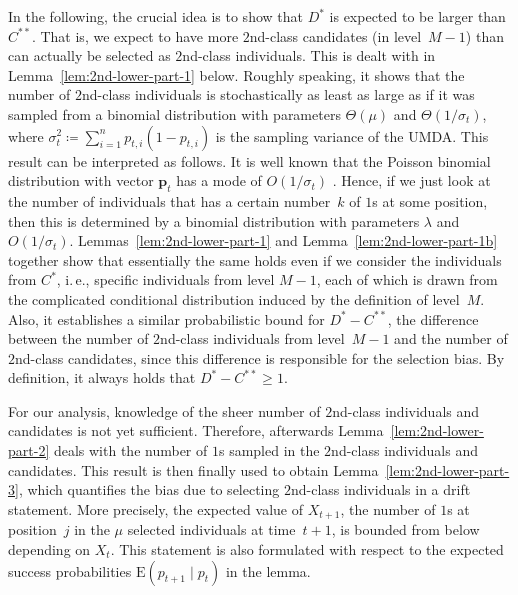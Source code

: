 \documentclass[11pt, a4paper]{article}
\newcommand{\umda}{UMDA\xspace}
\newcommand*{\E}{\mathrm{E}}
\newcommand{\ie}{i.\,e.\xspace}
\begin{document}
In the following, the crucial idea is to show 
  that $D^*$ is expected to be larger than $C^{**}$. 
That is, we expect to  
have more $2$nd-class candidates (in level~$M-1$) than can actually be selected 
as $2$nd-class individuals. This is dealt with in Lemma~\ref{lem:2nd-lower-part-1} below. Roughly speaking, it shows 
that the number of $2$nd-class individuals is stochastically as least as large as if it was sampled 
from a binomial distribution with parameters $\Theta(\mu)$ and $\Theta(1/\sigma_t)$, 
where $\sigma_t^2\coloneqq \sum_{i=1}^n p_{t,i}(1-p_{t,i})$ is the sampling variance of the \umda. This result can be 
interpreted as follows. It is well known that the Poisson binomial distribution with vector $\bm{p}_t$ has a mode of $O(1/\sigma_t)$ 
\cite{BaillonModePoissonBinomial}. 
Hence, if we just look at 
the number of individuals that has a certain number~$k$ of $1$s at some position, 
then this is determined by a binomial distribution 
with parameters $\lambda$ and $O(1/\sigma_t)$. Lemmas~\ref{lem:2nd-lower-part-1} and 
Lemma~\ref{lem:2nd-lower-part-1b} together show
 that essentially 
the same holds even if we consider the individuals from $C^*$, \ie, specific individuals 
from level $M-1$, each of which is 
drawn from the complicated conditional distribution induced by the definition of level~$M$. Also, it establishes 
a similar probabilistic bound for $D^*-C^{**}$, the difference between the number of $2$nd-class individuals from level~$M-1$ and 
the number of $2$nd-class candidates, since this difference  
is responsible for the selection bias. By definition, it always holds that $D^*-C^{**}\ge 1$.

For our analysis, knowledge of the sheer number of $2$nd-class individuals and 
candidates is not yet sufficient. Therefore, 
 afterwards Lemma~\ref{lem:2nd-lower-part-2} deals with the number of $1$s sampled in the $2$nd-class individuals 
and candidates. This result is then finally used to obtain Lemma~\ref{lem:2nd-lower-part-3}, which quantifies 
the bias due to selecting $2$nd-class individuals in a drift statement. More precisely, the expected value of $X_{t+1}$, the 
number of $1$s at position~$j$ in the $\mu$ selected individuals 
 at time~$t+1$,  is bounded from below depending on $X_t$. 
This statement is also formulated with respect to the expected success probabilities $\E(p_{t+1}\mid p_t)$  
in the lemma.
\end{document}
